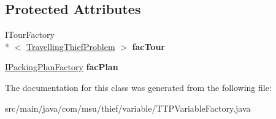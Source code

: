 \subsection*{Protected Attributes}
\begin{DoxyCompactItemize}
\item 
\hypertarget{classcom_1_1msu_1_1thief_1_1variable_1_1TTPVariableFactory_ad68bd9a1906cfe270ec71bec4814a544}{I\-Tour\-Factory\\*
$<$ \hyperlink{classcom_1_1msu_1_1thief_1_1problems_1_1TravellingThiefProblem}{Travelling\-Thief\-Problem} $>$ {\bfseries fac\-Tour}}\label{classcom_1_1msu_1_1thief_1_1variable_1_1TTPVariableFactory_ad68bd9a1906cfe270ec71bec4814a544}

\item 
\hypertarget{classcom_1_1msu_1_1thief_1_1variable_1_1TTPVariableFactory_adabbde28604cafa9727be18c8218114c}{\hyperlink{interfacecom_1_1msu_1_1thief_1_1model_1_1packing_1_1IPackingPlanFactory}{I\-Packing\-Plan\-Factory} {\bfseries fac\-Plan}}\label{classcom_1_1msu_1_1thief_1_1variable_1_1TTPVariableFactory_adabbde28604cafa9727be18c8218114c}

\end{DoxyCompactItemize}


The documentation for this class was generated from the following file\-:\begin{DoxyCompactItemize}
\item 
src/main/java/com/msu/thief/variable/T\-T\-P\-Variable\-Factory.\-java\end{DoxyCompactItemize}

